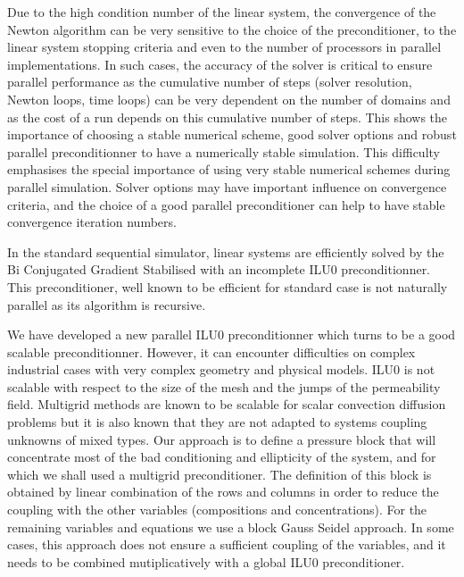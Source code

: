 \documentclass{report}
\begin{document}
Due to the high condition number of the linear system, the convergence
of the Newton algorithm can be very sensitive to the choice of the
preconditioner, to the linear system stopping criteria and even to the
number of processors in parallel implementations. In such cases, the
accuracy of the solver is critical to ensure parallel performance as
the cumulative number of steps (solver resolution, Newton loops, time
loops) can be very dependent on the number of domains and as the cost
of a run depends on this cumulative number of steps. This shows the
importance of choosing a stable numerical scheme, good solver options
and robust parallel preconditionner to have a numerically stable
simulation. This difficulty emphasises the special importance of using
very stable numerical schemes during parallel simulation. Solver
options may have important influence on convergence criteria, and the
choice of a good parallel preconditioner can help to have stable
convergence iteration numbers.

In the standard sequential simulator, linear systems are efficiently
solved by the Bi Conjugated Gradient Stabilised with an incomplete ILU0
preconditionner. This preconditioner, well known to be efficient for
standard case is not naturally parallel as its algorithm is recursive.

We have developed a new parallel ILU0 preconditionner which turns to be
a good scalable preconditionner. However, it can encounter difficulties
on complex industrial cases with very complex geometry and physical
models. ILU0 is not scalable with respect to the size of the mesh and
the jumps of the permeability field. Multigrid methods are known to be
scalable for scalar convection diffusion problems but it is also known
that they are not adapted to systems coupling unknowns of mixed types.
Our approach is to define a pressure block that will concentrate most
of the bad conditioning and ellipticity of the system, and for which we
shall used a multigrid preconditioner. The definition of this block is
obtained by linear combination of the rows and columns in order to
reduce the coupling with the other variables (compositions and
concentrations). For the remaining variables and equations we use a
block Gauss Seidel approach. In some cases, this approach does not
ensure a sufficient coupling of the variables, and it needs to be
combined mutiplicatively with a global ILU0 preconditioner.
\end{document}

